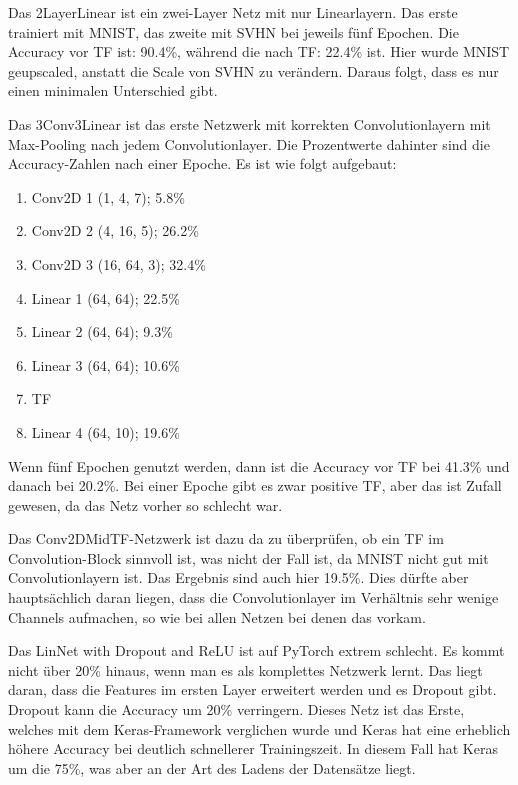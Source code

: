     Das 2LayerLinear ist ein zwei-Layer Netz mit nur Linearlayern. Das erste trainiert 
    mit MNIST, das zweite mit SVHN bei jeweils fünf Epochen. Die Accuracy vor TF ist: 
    90.4\%, während die nach TF: 22.4\% ist. Hier wurde MNIST geupscaled, anstatt die Scale 
    von SVHN zu verändern. Daraus folgt, dass es nur einen minimalen Unterschied gibt.

    Das 3Conv3Linear ist das erste Netzwerk mit korrekten Convolutionlayern mit Max-Pooling 
    nach jedem Convolutionlayer. Die Prozentwerte dahinter sind die Accuracy-Zahlen 
    nach einer Epoche. Es ist wie folgt aufgebaut: 
    \begin{enumerate}
        \item Conv2D 1 (1, 4, 7); 5.8\%
        \item Conv2D 2 (4, 16, 5); 26.2\%
        \item Conv2D 3 (16, 64, 3); 32.4\%
        \item Linear 1 (64, 64); 22.5\%
        \item Linear 2 (64, 64); 9.3\%
        \item Linear 3 (64, 64); 10.6\%
        \item TF
        \item Linear 4 (64, 10); 19.6\%
    \end{enumerate}
    Wenn fünf Epochen genutzt werden, dann ist die Accuracy vor TF bei 41.3\% und danach bei 
    20.2\%. Bei einer Epoche gibt es zwar positive TF, aber das ist Zufall gewesen, da 
    das Netz vorher so schlecht war. 

    Das Conv2DMidTF-Netzwerk ist dazu da zu überprüfen, ob ein TF im Convolution-Block sinnvoll ist, 
    was nicht der Fall ist, da MNIST nicht gut mit Convolutionlayern ist. Das Ergebnis sind 
    auch hier 19.5\%. Dies dürfte aber hauptsächlich daran liegen, dass die Convolutionlayer im 
    Verhältnis sehr wenige Channels aufmachen, so wie bei allen Netzen bei denen das vorkam. 
    
    Das LinNet with Dropout and ReLU ist auf PyTorch extrem schlecht. Es kommt nicht über 20\% hinaus, 
    wenn man es als komplettes Netzwerk lernt. Das liegt daran, dass die Features im ersten 
    Layer erweitert werden und es Dropout gibt. Dropout kann die Accuracy um 20\% verringern. 
    Dieses Netz ist das Erste, welches mit dem Keras-Framework verglichen wurde und Keras hat 
    eine erheblich höhere Accuracy bei deutlich schnellerer Trainingszeit. In diesem Fall hat 
    Keras um die 75\%, was aber an der Art des Ladens der Datensätze liegt.

